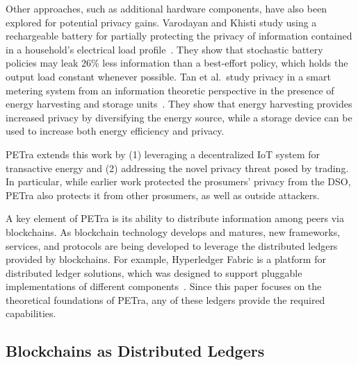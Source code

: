 Other approaches, such as additional hardware components, have also been explored 
for potential privacy gains. 
Varodayan and Khisti study using a
rechargeable battery for partially protecting the privacy of
information contained in a household's electrical load
profile~\cite{varodayan2011smart}. They show that stochastic battery
policies may leak 26\% less information than a best-effort policy,
which holds the output load constant whenever possible. Tan et
al.\ study privacy in a smart metering system from an information
theoretic perspective in the presence of energy harvesting and storage
units~\cite{tan2013increasing}. They show that energy harvesting
provides increased privacy by diversifying the energy source, while a
storage device can be used to increase both energy efficiency and
privacy.

PETra extends this work by (1) leveraging a decentralized IoT
system for transactive energy and (2) addressing the novel privacy
threat posed by trading. In particular, while earlier work protected
the prosumers' privacy from the DSO, PETra also protects it from other
prosumers, as well as outside attackers.

A key element of PETra is its ability to distribute information among
peers via blockchains.  As blockchain technology develops and matures,
new frameworks, services, and protocols are being developed to
leverage the distributed ledgers provided by blockchains. For example,
Hyperledger Fabric is a platform for distributed ledger solutions,
which was designed to support pluggable implementations of different
components~\cite{hyperledger2017fabric}.
Since this paper focuses on the theoretical foundations of PETra, any
of these  ledgers provide the required capabilities.


\iffalse
\subsection{Blockchains as Distributed Ledgers}

